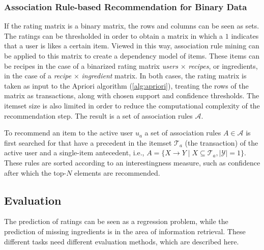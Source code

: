 

\subsubsection{Association Rule-based Recommendation for Binary Data}
\label{subsubsec:association_recommendation}

If the rating matrix is a binary matrix, the rows and columns can be seen as sets.
The ratings can be thresholded in order to obtain a matrix in which a $1$ indicates that a user is likes a certain item.
Viewed in this way, association rule mining can be applied to this matrix to create a dependency model of items.
These items can be recipes in the case of a binarized rating matrix \emph{users} $\times$ \emph{recipes}, or ingredients, in the case of a \emph{recipe} $\times$ \emph{ingredient} matrix.
In both cases, the rating matrix is taken as input to the Apriori algorithm (\cref{alg:apriori}), treating the rows of the matrix as transactions, along with chosen support and confidence thresholds.
The itemset size is also limited in order to reduce the computational complexity of the recommendation step.
The result is a set of association rules $\mathcal{A}$.

To recommend an item to the active user $u_a$ a set of association rules $A \in \mathcal{A}$ is first searched for that have a precedent in the itemset $\mathcal{T}_a$ (the transaction) of the active user and a single-item antecedent, i.e., $A = \{X \rightarrow Y \mid X \subseteq \mathcal{T}_a, |\mathcal{Y}|=1\}$.
These rules are sorted according to an interestingness measure, such as confidence after which the top-$N$ elements are recommended.




\subsection{Evaluation}
\label{subsec:evaluation}

The prediction of ratings can be seen as a regression problem, while the prediction of missing ingredients is in the area of information retrieval.
These different tasks need different evaluation methods, which are described here.